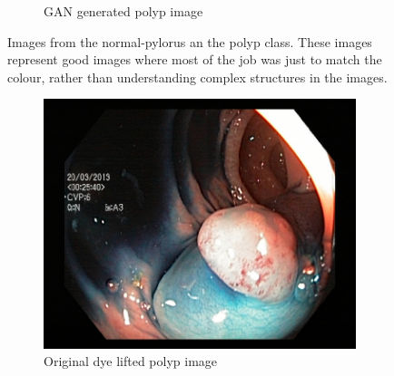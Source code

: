 \begin{figure}[h]
\begin{subfigure}[t]{\myfigsizethree}
            \caption{GAN generated polyp image}    
            \label{fig:p_GAN_both1}
        \end{subfigure}
        \caption{Images from the normal-pylorus an the polyp class. These images represent good images where most of the job was just to match the colour, rather than understanding complex structures in the images.} 
        \label{fig:AE_GAN_BOTH1}
    \end{figure}
    
    \begin{figure}[h]
            \tiny
        \begin{subfigure}[t]{\myfigsizethree}
            \centering
            \includegraphics[height=\textwidth ,width=\textwidth]{experiments/figures/both/DLORIG.jpg}
            \caption{Original dye lifted polyp image}    
            \label{fig:dlp_ORIG_BOTH2}
        \end{subfigure}
        \qquad
        \begin{subfigure}[t]{\myfigsizethree}
            \centering

\end{subfigure}
\end{figure}
